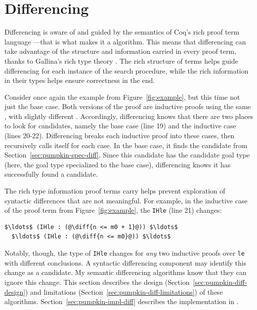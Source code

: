 \section{Differencing}
\label{sec:pumpkin-diff}



Differencing is aware of and guided by the semantics of Coq's rich proof term language ---that is what makes it a  algorithm.
This means that differencing can take advantage of the structure and information carried in every proof term,
thanks to Gallina's rich type theory .
The rich structure of terms helps guide differencing for each instance of the search procedure,
while the rich information in their types helps ensure correctness in the end.

Consider once again the example from Figure~\ref{fig:example}, but this time not just the base case.
Both versions of the proof are inductive proofs using the same , with slightly different .
Accordingly, differencing knows that there are two places to look for candidates, namely the base case (line 19)
and the inductive case (lines 20-22).
Differencing breaks each inductive proof into these cases, then recursively calls itself for each case.
In the base case, it finds the candidate from Section~\ref{sec:pumpkin-spec-diff}.
Since this candidate has the candidate goal type (here, the goal type specialized to the base case), differencing knows it has successfully found a candidate.

The rich type information proof terms carry helps prevent exploration of syntactic differences that are not meaningful.
For example, in the inductive case of the proof term from Figure~\ref{fig:example}, the  \lstinline{IHle} (line 21) changes:

\begin{lstlisting}[language=coq]
  $\ldots$ (IHle : (@\diff{n <= m0 + 1}@)) $\ldots$
  $\ldots$ (IHle : (@\diff{n <= m0}@)) $\ldots$
\end{lstlisting}
Notably, though, the type of \lstinline{IHle} changes for \emph{any} two inductive proofs over \lstinline{le}
with different conclusions. A syntactic differencing component 
may identify this change as a candidate.
My semantic differencing algorithms know that they can ignore this change.
This section describes the design (Section~\ref{sec:pumpkin-diff-design}) and limitations (Section~\ref{sec:pumpkin-diff-limitations}) of these algorithms.
Section~\ref{sec:pumpkin-impl-diff} describes the implementation in \sysname.

